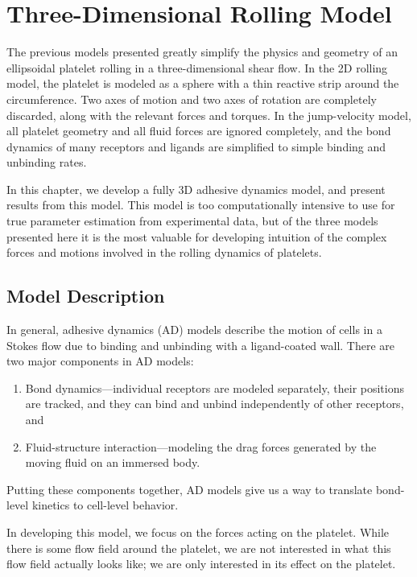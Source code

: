 
\chapter{Three-Dimensional Rolling Model}
\label{cha:three-dimens-roll}

The previous models presented greatly simplify the physics and
geometry of an ellipsoidal platelet rolling in a three-dimensional
shear flow. In the 2D rolling model, the platelet is modeled as a
sphere with a thin reactive strip around the circumference. Two axes
of motion and two axes of rotation are completely discarded, along
with the relevant forces and torques. In the jump-velocity model, all
platelet geometry and all fluid forces are ignored completely, and the
bond dynamics of many receptors and ligands are simplified to simple
binding and unbinding rates.

In this chapter, we develop a fully 3D adhesive dynamics model, and
present results from this model. This model is too computationally
intensive to use for true parameter estimation from experimental data,
but of the three models presented here it is the most valuable for
developing intuition of the complex forces and motions involved in the
rolling dynamics of platelets.

\section{Model Description}
\label{sec:model-description}

In general, adhesive dynamics (AD) models describe the motion of cells
in a Stokes flow due to binding and unbinding with a ligand-coated
wall. There are two major components in AD models:
\begin{enumerate}
\item Bond dynamics---individual receptors are modeled separately,
  their positions are tracked, and they can bind and unbind
  independently of other receptors, and
\item Fluid-structure interaction---modeling the drag forces generated
  by the moving fluid on an immersed body.
\end{enumerate}
Putting these components together, AD models give us a way to
translate bond-level kinetics to cell-level behavior.

In developing this model, we focus on the forces acting on the
platelet. While there is some flow field around the platelet, we are
not interested in what this flow field actually looks like; we are
only interested in its effect on the platelet.

